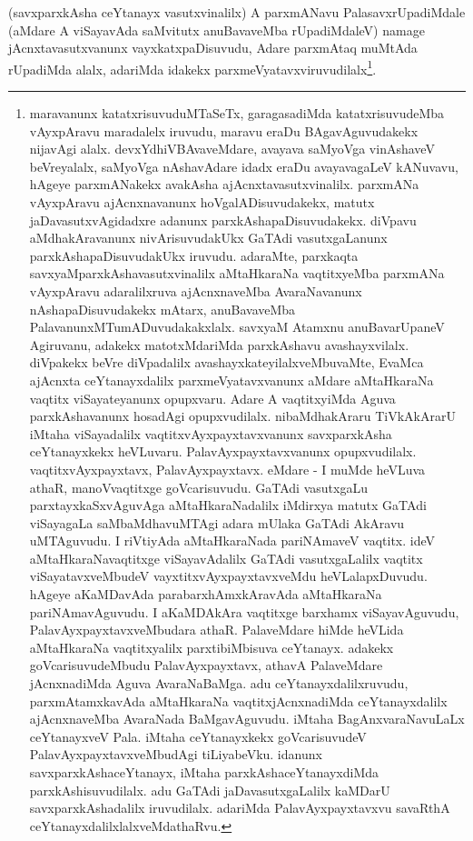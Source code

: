 \begin{artha} 
(savxparxkAsha ceYtanayx vasutxvinalilx) A parxmANavu PalasavxrUpadiMdale (aMdare A viSayavAda saMvitutx anuBavaveMba rUpadiMdaleV) namage jAcnxtavasutxvanunx vayxkatxpaDisuvudu, Adare parxmAtaq muMtAda rUpadiMda alalx, adariMda idakekx parxmeVyatavxviruvudilalx\footnote{maravanunx katatxrisuvuduMTaSeTx, garagasadiMda katatxrisuvudeMba vAyxpAravu maradalelx iruvudu, maravu eraDu BAgavAguvudakekx nijavAgi alalx. devxYdhiVBAvaveMdare, avayava saMyoVga vinAshaveV beVreyalalx, saMyoVga nAshavAdare idadx eraDu avayavagaLeV kANuvavu, hAgeye parxmANakekx avakAsha ajAcnxtavasutxvinalilx. parxmANa vAyxpAravu ajAcnxnavanunx hoVgalADisuvudakekx, matutx jaDavasutxvAgidadxre adanunx parxkAshapaDisuvudakekx. diVpavu aMdhakAravanunx nivArisuvudakUkx GaTAdi vasutxgaLanunx parxkAshapaDisuvudakUkx iruvudu. adaraMte, parxkaqta savxyaMparxkAshavasutxvinalilx aMtaHkaraNa vaqtitxyeMba parxmANa vAyxpAravu adaralilxruva ajAcnxnaveMba AvaraNavanunx nAshapaDisuvudakekx mAtarx, anuBavaveMba PalavanunxMTumADuvudakakxlalx. savxyaM Atamxnu anuBavarUpaneV Agiruvanu, adakekx matotxMdariMda parxkAshavu avashayxvilalx. diVpakekx beVre diVpadalilx avashayxkateyilalxveMbuvaMte, EvaMca ajAcnxta ceYtanayxdalilx parxmeVyatavxvanunx aMdare aMtaHkaraNa vaqtitx viSayateyanunx opupxvaru. Adare A vaqtitxyiMda Aguva parxkAshavanunx hosadAgi opupxvudilalx. nibaMdhakAraru TiVkAkArarU iMtaha viSayadalilx vaqtitxvAyxpayxtavxvanunx savxparxkAsha ceYtanayxkekx heVLuvaru. PalavAyxpayxtavxvanunx opupxvudilalx. vaqtitxvAyxpayxtavx, PalavAyxpayxtavx. eMdare - I muMde heVLuva athaR, manoVvaqtitxge goVcarisuvudu. GaTAdi vasutxgaLu parxtayxkaSxvAguvAga aMtaHkaraNadalilx iMdirxya matutx GaTAdi viSayagaLa saMbaMdhavuMTAgi adara mUlaka GaTAdi AkAravu uMTAguvudu. I riVtiyAda aMtaHkaraNada pariNAmaveV vaqtitx. ideV aMtaHkaraNavaqtitxge viSayavAdalilx GaTAdi vasutxgaLalilx vaqtitx viSayatavxveMbudeV vayxtitxvAyxpayxtavxveMdu heVLalapxDuvudu. hAgeye aKaMDavAda parabarxhAmxkAravAda aMtaHkaraNa pariNAmavAguvudu. I aKaMDAkAra vaqtitxge barxhamx viSayavAguvudu, PalavAyxpayxtavxveMbudara athaR. PalaveMdare hiMde heVLida aMtaHkaraNa vaqtitxyalilx parxtibiMbisuva ceYtanayx. adakekx goVcarisuvudeMbudu PalavAyxpayxtavx, athavA PalaveMdare jAcnxnadiMda Aguva AvaraNaBaMga. adu ceYtanayxdalilxruvudu, parxmAtamxkavAda aMtaHkaraNa vaqtitxjAcnxnadiMda ceYtanayxdalilx ajAcnxnaveMba AvaraNada BaMgavAguvudu. iMtaha BagAnxvaraNavuLaLx ceYtanayxveV Pala. iMtaha ceYtanayxkekx goVcarisuvudeV PalavAyxpayxtavxveMbudAgi tiLiyabeVku. idanunx savxparxkAshaceYtanayx, iMtaha parxkAshaceYtanayxdiMda parxkAshisuvudilalx. adu GaTAdi jaDavasutxgaLalilx kaMDarU savxparxkAshadalilx iruvudilalx. adariMda PalavAyxpayxtavxvu savaRthA ceYtanayxdalilxlalxveMdathaRvu.}.
\end{artha}

